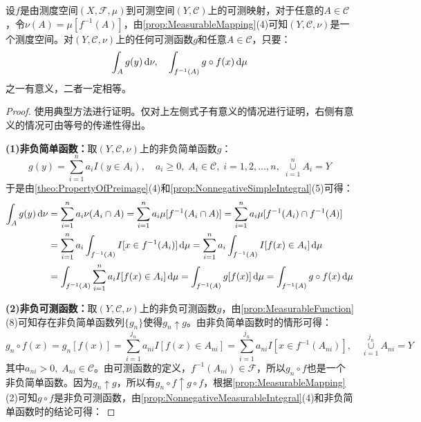 \begin{theorem}\label{theo:IntBySubstitution}
	设$f$是由测度空间$(X,\mathscr{F},\mu)$到可测空间$(Y,\mathscr{C})$上的可测映射，对于任意的$A\in\mathscr{C}$，令$\nu(A)=\mu[f^{-1}(A)]$，由\cref{prop:MeasurableMapping}(4)可知$(Y,\mathscr{C},\nu)$是一个测度空间。对$(Y,\mathscr{C},\nu)$上的任何可测函数$g$和任意$A\in\mathscr{C}$，只要：
	\begin{equation*}
		\int_Ag(y)\mathop{}\!\mathrm{d}\nu,\quad\int_{f^{-1}(A)}g\circ f(x)\mathop{}\!\mathrm{d}\mu
	\end{equation*}
	之一有意义，二者一定相等。
\end{theorem}
\begin{proof}
	使用典型方法进行证明。仅对上左侧式子有意义的情况进行证明，右侧有意义的情况可由等号的传递性得出。\par
	\textbf{(1)非负简单函数：}取$(Y,\mathscr{C},\nu)$上的非负简单函数$g$：
	\begin{equation*}
		g(y)=\sum_{i=1}^{n}a_iI(y\in A_i),\quad a_i\geqslant0,\;A_i\in\mathscr{C},\;i=1,2,\dots,n,\;\underset{i=1}{\overset{n}{\cup}}A_i=Y
	\end{equation*}
	于是由\cref{theo:PropertyOfPreimage}(4)和\cref{prop:NonnegativeSimpleIntegral}(5)可得：
	\begin{align*}
		\int_{A}g(y)\mathop{}\!\mathrm{d}\nu&=\sum_{i=1}^{n}a_i\nu(A_i\cap A)=\sum_{i=1}^{n}a_i\mu[f^{-1}(A_i\cap A)]=\sum_{i=1}^{n}a_i\mu[f^{-1}(A_i)\cap f^{-1}(A)] \\
		&=\sum_{i=1}^{n}a_i\int_{f^{-1}(A)}I[x\in f^{-1}(A_i)]\mathop{}\!\mathrm{d}\mu=\sum_{i=1}^{n}a_i\int_{f^{-1}(A)}I[f(x)\in A_i]\mathop{}\!\mathrm{d}\mu \\
		&=\int_{f^{-1}(A)}\sum_{i=1}^{n}a_iI[f(x)\in A_i]\mathop{}\!\mathrm{d}\mu=\int_{f^{-1}(A)}g[f(x)]\mathop{}\!\mathrm{d}\mu=\int_{f^{-1}(A)}g\circ f(x)\mathop{}\!\mathrm{d}\mu
	\end{align*}\par
	\textbf{(2)非负可测函数：}取$(Y,\mathscr{C},\nu)$上的非负可测函数$g$，由\cref{prop:MeasurableFunction}(8)可知存在非负简单函数列$\{g_n\}$使得$g_n\uparrow g$。由非负简单函数时的情形可得：
	\begin{equation*}
		g_n\circ f(x)=g_n[f(x)]=\sum_{i=1}^{j_n}a_{ni}I[f(x)\in A_{ni}]=\sum_{i=1}^{j_n}a_{ni}I[x\in f^{-1}(A_{ni})],\quad\underset{i=1}{\overset{j_n}{\cup}}A_{ni}=Y
	\end{equation*}
	其中$a_{ni}>0,\;A_{ni}\in\mathscr{C}$。由可测函数的定义，$f^{-1}(A_{ni})\in\mathscr{F}$，所以$g_n\circ f$也是一个非负简单函数。因为$g_n\uparrow g$，所以有$g_n\circ f\uparrow g\circ f$，根据\cref{prop:MeasurableMapping}(2)可知$g\circ f$是非负可测函数，由\cref{prop:NonnegativeMeasurableIntegral}(4)和非负简单函数时的结论可得：

\end{proof}
